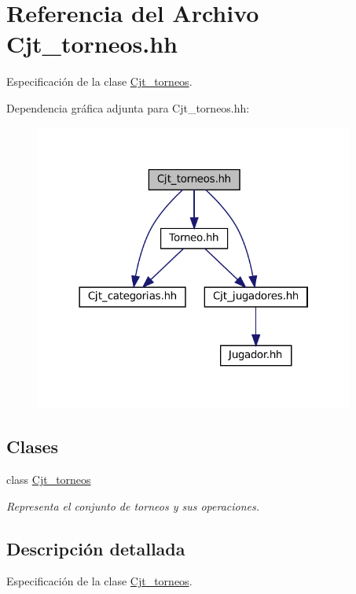\hypertarget{_cjt__torneos_8hh}{}\section{Referencia del Archivo Cjt\+\_\+torneos.\+hh}
\label{_cjt__torneos_8hh}


Especificación de la clase \hyperlink{class_cjt__torneos}{Cjt\+\_\+torneos}.  


Dependencia gráfica adjunta para Cjt\+\_\+torneos.\+hh\+:\nopagebreak
\begin{figure}[H]
\begin{center}
\leavevmode
\includegraphics[width=298pt]{_cjt__torneos_8hh__incl}
\end{center}
\end{figure}
\subsection*{Clases}
\begin{DoxyCompactItemize}
\item 
class \hyperlink{class_cjt__torneos}{Cjt\+\_\+torneos}
\begin{DoxyCompactList}\small\item\em Representa el conjunto de torneos y sus operaciones. \end{DoxyCompactList}\end{DoxyCompactItemize}


\subsection{Descripción detallada}
Especificación de la clase \hyperlink{class_cjt__torneos}{Cjt\+\_\+torneos}. 

